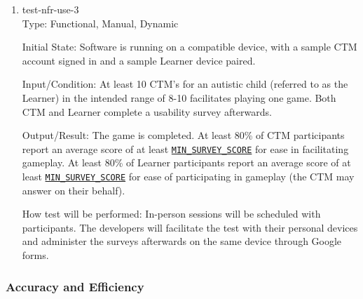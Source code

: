 \documentclass[12pt, titlepage]{article}
\newcommand{\paramref}[2]{\hyperlink{param:#1}{\texttt{#2}}}
\begin{document}
\begin{enumerate}
\item\label{test-nfr-use-3} test-nfr-use-3\\

Type: Functional, Manual, Dynamic
					
Initial State: Software is running on a compatible device, with a sample CTM account signed in and a sample Learner device paired.
					
Input/Condition: At least 10 CTM's for an autistic child (referred to as the Learner) in the intended range of 8-10 facilitates playing one game. Both CTM and Learner complete a usability survey afterwards.
					
Output/Result: The game is completed. At least 80\% of CTM participants report an average score of at least \paramref{min-survey-score}{MIN\_SURVEY\_SCORE} for ease in facilitating gameplay. At least 80\% of Learner participants report an average score of at least \paramref{min-survey-score}{MIN\_SURVEY\_SCORE} for ease of participating in gameplay (the CTM may answer on their behalf).
					
How test will be performed: In-person sessions will be scheduled with participants. The developers will facilitate the test with their personal devices and administer the surveys afterwards on the same device through Google forms.

\end{enumerate}

\subsubsection{Accuracy and Efficiency}
\end{document}
